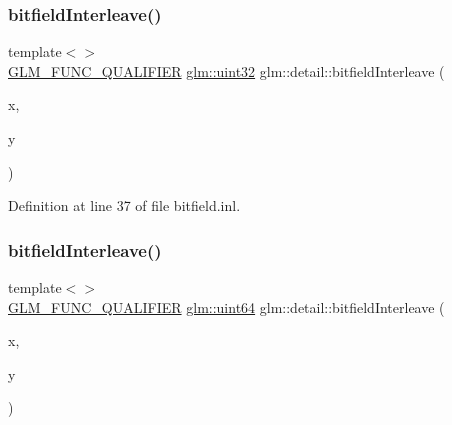 \subsubsection{\texorpdfstring{bitfieldInterleave()}{bitfieldInterleave()}\hspace{0.1cm}{\footnotesize\ttfamily [5/11]}}
{\footnotesize\ttfamily template$<$$>$ \\
\mbox{\hyperlink{setup_8hpp_a33fdea6f91c5f834105f7415e2a64407}{G\+L\+M\+\_\+\+F\+U\+N\+C\+\_\+\+Q\+U\+A\+L\+I\+F\+I\+ER}} \mbox{\hyperlink{group__gtc__type__precision_ga202b6a53c105fcb7e531f9b443518451}{glm\+::uint32}} glm\+::detail\+::bitfield\+Interleave (\begin{DoxyParamCaption}\item[{\mbox{\hyperlink{group__gtc__type__precision_gad8c2939e1fdd8e5828b31d95c52255d5}{glm\+::uint16}}}]{x,  }\item[{\mbox{\hyperlink{group__gtc__type__precision_gad8c2939e1fdd8e5828b31d95c52255d5}{glm\+::uint16}}}]{y }\end{DoxyParamCaption})}



Definition at line 37 of file bitfield.\+inl.

\mbox{\label{namespaceglm_1_1detail_a7f40bc91b3d293fae0f7df8de85cdcc6}} 
\subsubsection{\texorpdfstring{bitfieldInterleave()}{bitfieldInterleave()}\hspace{0.1cm}{\footnotesize\ttfamily [6/11]}}
{\footnotesize\ttfamily template$<$$>$ \\
\mbox{\hyperlink{setup_8hpp_a33fdea6f91c5f834105f7415e2a64407}{G\+L\+M\+\_\+\+F\+U\+N\+C\+\_\+\+Q\+U\+A\+L\+I\+F\+I\+ER}} \mbox{\hyperlink{group__gtc__type__precision_gae3632bf9b37da66233d78930dd06378a}{glm\+::uint64}} glm\+::detail\+::bitfield\+Interleave (\begin{DoxyParamCaption}\item[{\mbox{\hyperlink{group__gtc__type__precision_ga202b6a53c105fcb7e531f9b443518451}{glm\+::uint32}}}]{x,  }\item[{\mbox{\hyperlink{group__gtc__type__precision_ga202b6a53c105fcb7e531f9b443518451}{glm\+::uint32}}}]{y }\end{DoxyParamCaption})}



